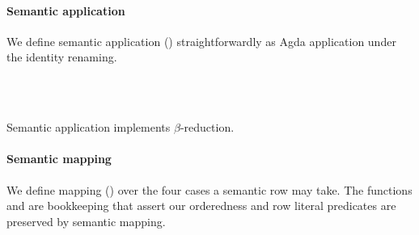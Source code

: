\documentclass[sigplan,screen]{acmart}
\begin{document}
\paragraph{Semantic application}

We define semantic application () straightforwardly as Agda application under the identity renaming.

\begin{code}%
%
\>[2]%
\>[1644I]\AgdaSymbol{:}\AgdaSpace{}%
\AgdaSpace{}%
\AgdaSpace{}%
\AgdaSymbol{(}\AgdaSpace{}%
\AgdaSpace{}%
\AgdaSymbol{)}\AgdaSpace{}%
\AgdaSpace{}%
\AgdaSpace{}%
\AgdaSpace{}%
\AgdaSpace{}%
\<%
\\
\>[1644I][@{}l@{\AgdaIndent{0}}]%
\>[9]\AgdaSpace{}%
\AgdaSpace{}%
\<%
\\
%
\>[2]\AgdaSpace{}%
\AgdaSpace{}%
\AgdaSpace{}%
\AgdaSymbol{=}\AgdaSpace{}%
\AgdaSpace{}%
\AgdaSpace{}%
\<%
\end{code}

\Ni Semantic application implements $\beta$-reduction. 

\paragraph{Semantic mapping}
We define mapping () over the four cases a semantic row may take. The functions  and  are bookkeeping that assert our orderedness and row literal predicates are preserved by semantic mapping.
\end{document}
